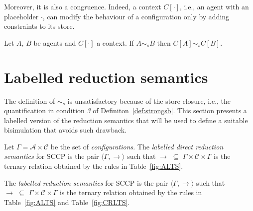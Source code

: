 \documentclass{llncs}
\def\C{{\mathcal C}}
\newcommand{\rarrow}{\rightarrow}
\def\C{{\mathcal C}}
\begin{document}
Moreover, it is also a congruence. Indeed, a context $C[\cdot]$, i.e., an agent with an placeholder $\cdot$,
can modify the behaviour of a configuration only by adding constraints to its store. 

\begin{proposition}
Let $A$, $B$ be agents and $C[\cdot]$ a context.
If $A \sim_{\mathit{s}} B$
then $C[A] \sim_{\mathit{s}} C[B]$.
\end{proposition}


%


\section{Labelled reduction semantics}
The definition of $\sim_{\mathit{s}}$ 
is unsatisfactory
because of the store closure, i.e., the quantification in condition \emph{3} of 
Definiton~\ref{def:strongsb}.
This section presents a labelled version of the reduction semantics that will be used to 
define a suitable bisimulation that avoids such drawback.

\begin{definition}
	Let $\Gamma = {\mathcal A} \times \C$ be the set of \emph{configurations}.
	The  \emph{labelled direct reduction semantics} for SCCP is the pair 
	$\langle \Gamma,   \xrightarrow{ }  \rangle$
	such that $\to \, \, \subseteq \, \,\Gamma \times \mathcal{C} \times \Gamma$ is the ternary
	relation obtained by the rules in Table~\ref{fig:ALTS}.
	
	The \emph{labelled reduction semantics} for SCCP is the pair 
	$\langle \Gamma,  \rightarrow \rangle$
	such that $\rarrow \, \, \subseteq \, \,\Gamma \times \mathcal{C} \times  \Gamma$ is the ternary relation
         obtained by the rules in Table~\ref{fig:ALTS} and Table~\ref{fig:CRLTS}.
\end{definition}
\end{document}
